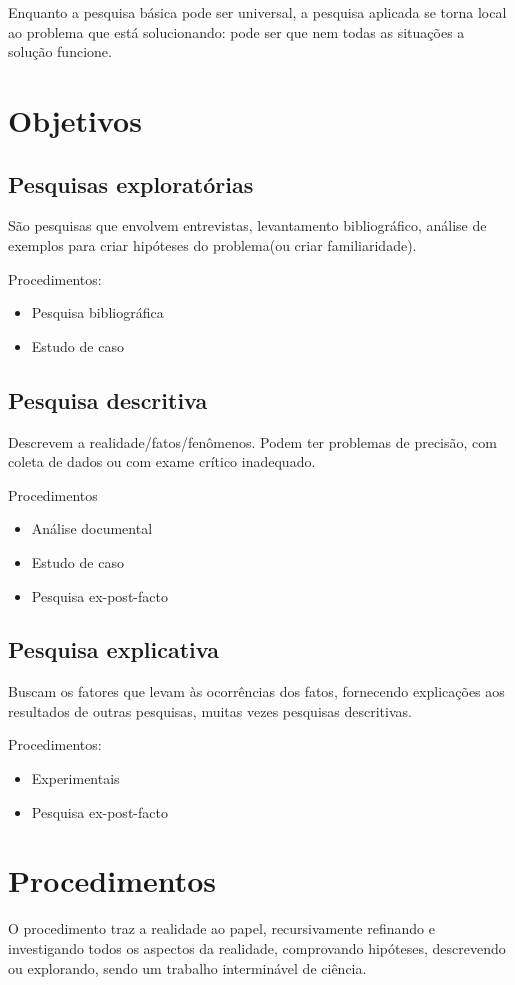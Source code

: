 Enquanto a pesquisa básica pode ser universal, a pesquisa aplicada se torna local ao problema que está solucionando: pode ser que nem todas as situações a solução funcione.


\section{Objetivos}
\subsection{Pesquisas exploratórias}
São pesquisas que envolvem entrevistas, levantamento bibliográfico, análise de exemplos para criar hipóteses do problema(ou criar familiaridade).

Procedimentos:
\begin{itemize}
    \item Pesquisa bibliográfica
    \item Estudo de caso
\end{itemize}

\subsection{Pesquisa descritiva}
Descrevem a realidade/fatos/fenômenos. Podem ter problemas de precisão, com coleta de dados ou com exame crítico inadequado.

Procedimentos
\begin{itemize}
    \item Análise documental
    \item Estudo de caso
    \item Pesquisa ex-post-facto
\end{itemize}

\subsection{Pesquisa explicativa}
Buscam os fatores que levam às ocorrências dos fatos, fornecendo explicações aos resultados de outras pesquisas, muitas vezes pesquisas descritivas.

Procedimentos:
\begin{itemize}
    \item Experimentais
    \item Pesquisa ex-post-facto
\end{itemize}


\section{Procedimentos}
O procedimento traz a realidade ao papel, recursivamente refinando e investigando todos os aspectos da realidade, comprovando hipóteses, descrevendo ou explorando, sendo um trabalho interminável de ciência.

